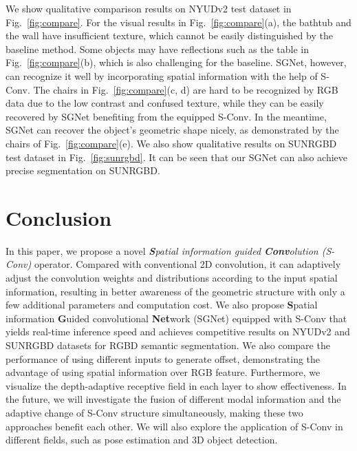 \documentclass[journal]{IEEEtran}
\newcommand{\figref}[1]{Fig.~\ref{#1}}
\newcommand{\mypara}[1]{\noindent {\textbf{#1}}}
\begin{document}
\mypara{Qualitative comparison results:}  
We show qualitative comparison results on NYUDv2 
test dataset in \figref{fig:compare}.
For the visual results in \figref{fig:compare}(a),
the bathtub and the wall have insufficient texture, which cannot 
be easily distinguished by the baseline method.
Some objects may have reflections such as the table in \figref{fig:compare}(b),
which is also challenging for the baseline.
SGNet, however, can recognize it well by incorporating 
spatial information with the help of S-Conv.
The chairs in \figref{fig:compare}(c, d) 
are hard to be recognized by RGB data due to the low contrast and
confused texture,
while they can be easily recovered by SGNet benefiting 
from the equipped S-Conv.
In the meantime, SGNet can recover the object's geometric shape nicely,
as demonstrated by the chairs of \figref{fig:compare}(e).
We also show qualitative results on SUNRGBD 
test dataset in \figref{fig:sunrgbd}. 
It can be seen that our SGNet can also achieve precise segmentation on SUNRGBD.






\section{Conclusion}
\label{sec:conclution}
In this paper, we propose a novel \emph{\textbf{S}patial information guided 
	\textbf{Conv}olution (S-Conv)}
operator.
Compared with conventional 2D convolution, it can adaptively
adjust the convolution weights and distributions according
to the input spatial information, resulting in better awareness
of the geometric structure with only a few additional parameters and computation cost.
We also propose \textbf{S}patial information \textbf{G}uided convolutional 
\textbf{Net}work (SGNet) equipped with S-Conv that yields real-time
inference speed and achieves competitive results on NYUDv2 and
SUNRGBD datasets for RGBD semantic segmentation.
We also compare the performance of using different inputs to generate offset, 
demonstrating the advantage of using spatial information over RGB feature.
Furthermore, we visualize the depth-adaptive receptive field in each layer to show effectiveness.
In the future, we will investigate the fusion of different modal information 
and the adaptive change of S-Conv structure simultaneously,
making these two approaches benefit each other. 
We will also explore the application of S-Conv in different fields,
such as pose estimation and 3D object detection.
\end{document}
